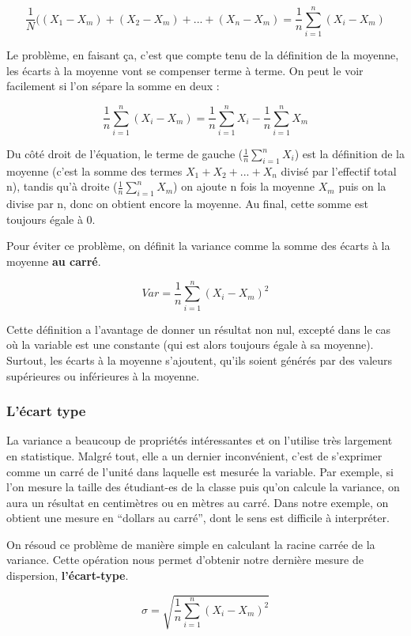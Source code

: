 \documentclass[
  french,
]{book}
\begin{document}
\[ \frac{1}{N}( (X_1 - X_m) + (X_2 - X_m) + ... + (X_n - X_m) = \frac{1}{n} \sum_{i = 1}^{n} (X_i - X_m) \]

Le problème, en faisant ça, c'est que compte tenu de la définition de la moyenne, les écarts à la moyenne vont se compenser terme à terme. On peut le voir facilement si l'on sépare la somme en deux :

\[ \frac{1}{n} \sum_{i = 1}^{n} (X_i - X_m) = \frac{1}{n} \sum_{i = 1}^{n} X_i - \frac{1}{n} \sum_{i = 1}^{n} X_m \]

Du côté droit de l'équation, le terme de gauche (\(\frac{1}{n} \sum_{i = 1}^{n} X_i\)) est la définition de la moyenne (c'est la somme des termes \(X_1+X_2+...+X_n\) divisé par l'effectif total n), tandis qu'à droite (\(\frac{1}{n} \sum_{i = 1}^{n} X_m\)) on ajoute n fois la moyenne \(X_m\) puis on la divise par n, donc on obtient encore la moyenne. Au final, cette somme est toujours égale à 0.

Pour éviter ce problème, on définit la variance comme la somme des écarts à la moyenne \textbf{au carré}.

\[ Var = \frac{1}{n} \sum_{i = 1}^{n} (X_i - X_m)^2 \]

Cette définition a l'avantage de donner un résultat non nul, excepté dans le cas où la variable est une constante (qui est alors toujours égale à sa moyenne). Surtout, les écarts à la moyenne s'ajoutent, qu'ils soient générés par des valeurs supérieures ou inférieures à la moyenne.

\hypertarget{luxe9cart-type}{%
\subsubsection{L'écart type}\label{luxe9cart-type}}

La variance a beaucoup de propriétés intéressantes et on l'utilise très largement en statistique. Malgré tout, elle a un dernier inconvénient, c'est de s'exprimer comme un carré de l'unité dans laquelle est mesurée la variable. Par exemple, si l'on mesure la taille des étudiant-es de la classe puis qu'on calcule la variance, on aura un résultat en centimètres ou en mètres au carré. Dans notre exemple, on obtient une mesure en ``dollars au carré'', dont le sens est difficile à interpréter.

On résoud ce problème de manière simple en calculant la racine carrée de la variance. Cette opération nous permet d'obtenir notre dernière mesure de dispersion, \textbf{l'écart-type}.

\[ \sigma = \sqrt{\frac{1}{n} \sum_{i = 1}^{n} (X_i - X_m)^2} \]
\end{document}
